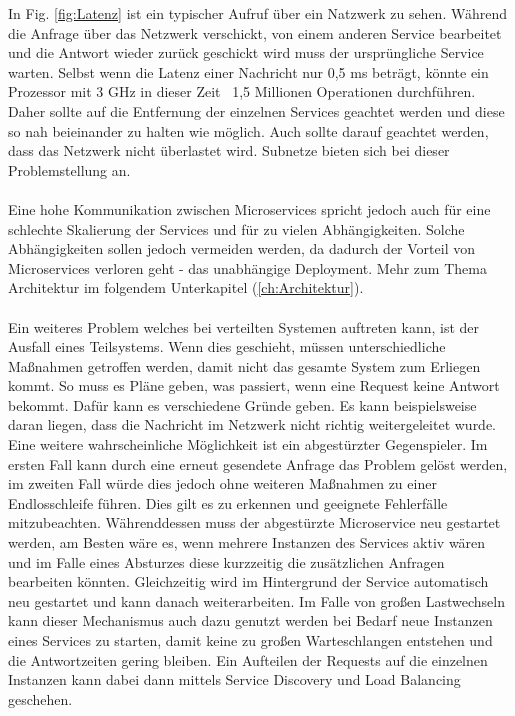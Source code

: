 In Fig. \ref{fig:Latenz} ist ein typischer Aufruf über ein Natzwerk zu sehen. Während die Anfrage über das Netzwerk verschickt, von einem anderen Service bearbeitet und die Antwort wieder zurück geschickt wird muss der ursprüngliche Service warten. Selbst wenn die Latenz einer Nachricht nur 0,5 ms beträgt, könnte ein Prozessor mit 3 GHz in dieser Zeit ~1,5 Millionen Operationen durchführen. Daher sollte auf die Entfernung der einzelnen Services geachtet werden und diese so nah beieinander zu halten wie möglich. Auch sollte darauf geachtet werden, dass das Netzwerk nicht überlastet wird. Subnetze bieten sich bei dieser Problemstellung an. \paragraph{}
Eine hohe Kommunikation zwischen Microservices spricht jedoch auch für eine schlechte Skalierung der Services und für zu vielen Abhängigkeiten. Solche Abhängigkeiten sollen jedoch vermeiden werden, da dadurch der Vorteil von Microservices verloren geht - das unabhängige Deployment. Mehr zum Thema Architektur im folgendem Unterkapitel (\ref{ch:Architektur}). \paragraph{}
Ein weiteres Problem welches bei verteilten Systemen auftreten kann, ist der Ausfall eines Teilsystems. Wenn dies geschieht, müssen unterschiedliche Maßnahmen getroffen werden, damit nicht das gesamte System zum Erliegen kommt. So muss es Pläne geben, was passiert, wenn eine Request keine Antwort bekommt. Dafür kann es verschiedene Gründe geben. Es kann beispielsweise daran liegen, dass die Nachricht im Netzwerk nicht richtig weitergeleitet wurde. Eine weitere wahrscheinliche Möglichkeit ist ein abgestürzter Gegenspieler. Im ersten Fall kann durch eine erneut gesendete Anfrage das Problem gelöst werden, im zweiten Fall würde dies jedoch ohne weiteren Maßnahmen zu einer Endlosschleife führen. Dies gilt es zu erkennen und geeignete Fehlerfälle mitzubeachten. \newline
Währenddessen muss der abgestürzte Microservice neu gestartet werden, am Besten wäre es, wenn mehrere Instanzen des Services aktiv wären und im Falle eines Absturzes diese kurzzeitig die zusätzlichen Anfragen bearbeiten könnten. Gleichzeitig wird im Hintergrund der Service automatisch neu gestartet und kann danach weiterarbeiten. \newline
Im Falle von großen Lastwechseln kann dieser Mechanismus auch dazu genutzt werden bei Bedarf neue Instanzen eines Services zu starten, damit keine zu großen Warteschlangen entstehen und die Antwortzeiten gering bleiben. Ein Aufteilen der Requests auf die einzelnen Instanzen kann dabei dann mittels Service Discovery und Load Balancing geschehen.

